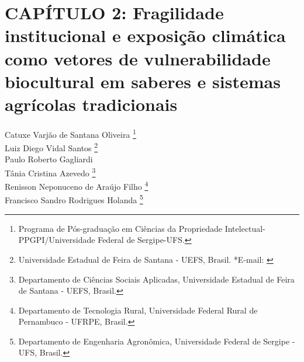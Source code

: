 \pagestyle{plain}

\chapter{CAPÍTULO 2: Fragilidade institucional e exposição climática como vetores de vulnerabilidade biocultural em saberes e sistemas agrícolas tradicionais}

\begin{flushright}
Catuxe Varjão de Santana Oliveira  \footnote[1]{Programa de Pós-graduação em Ciências da Propriedade Intelectual-PPGPI/Universidade Federal de Sergipe-UFS.}
\\[0.3cm]
Luiz Diego Vidal Santos \footnote[2]{Universidade Estadual de Feira de Santana - UEFS, Brasil. *E-mail: \href{mailto:ldvsantos@uefs.br}{}}
\\[0.3cm]
Paulo Roberto Gagliardi \footnotemark[1]
\\[0.3cm]
Tânia Cristina Azevedo \footnote[3]{Departamento de Ciências Sociais Aplicadas, Universidade Estadual de Feira de Santana - UEFS, Brasil.}
\\[0.3cm]
Renisson Neponuceno de Araújo Filho \footnote[4]{Departamento de Tecnologia Rural, Universidade Federal Rural de Pernambuco - UFRPE, Brasil.}
\\[0.3cm]
Francisco Sandro Rodrigues Holanda \footnote[5]{Departamento de Engenharia Agronômica, Universidade Federal de Sergipe - UFS, Brasil.}
\end{flushright}

